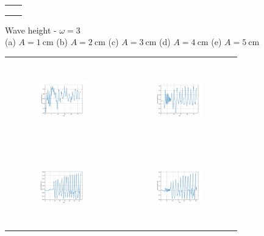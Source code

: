 \begin{figure}[H]
\begin{center}
\begin{tabular}{cc}
&
\\
&
\\
&
\\
\end{tabular}
\end{center}
\caption{Wave height - $\omega=3$ \\ (a) $A=1\mathrm{~cm}$ (b) $A=2\mathrm{~cm}$ (c) $A=3\mathrm{~cm}$ (d) $A=4\mathrm{~cm}$ (e) $A=5\mathrm{~cm}$}
\label{Data_omega=3_wave}
\end{figure}

\begin{figure}[H]
\begin{center}
\begin{tabular}{cc}
\includegraphics[width=0.45\textwidth, height=3.5cm]{graph/omega=1.00_A=1_wave.pdf}
&
\includegraphics[width=0.45\textwidth, height=3.5cm]{graph/omega=1.00_A=2_wave.pdf}\\
\includegraphics[width=0.45\textwidth, height=3.5cm]{graph/omega=1.00_A=3_wave.pdf}
&
\includegraphics[width=0.45\textwidth, height=3.5cm]{graph/omega=1.00_A=4_wave.pdf}\\

\end{tabular}
\end{center}
\end{figure}
